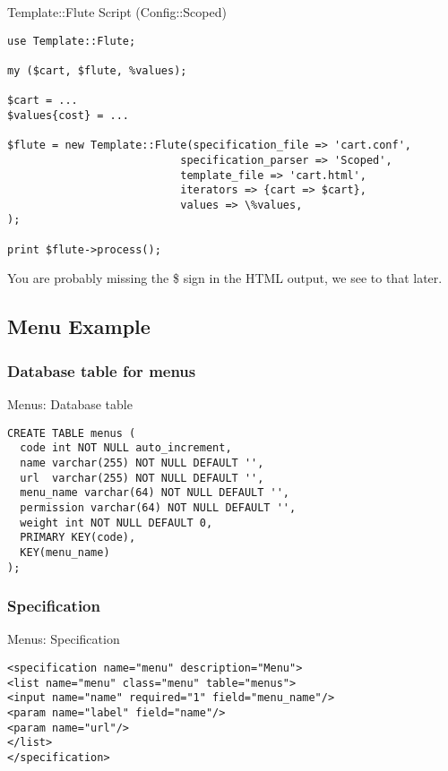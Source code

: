 \begin{frame}[fragile]{Template::Flute Script (Config::Scoped)}
\begin{lstlisting}
use Template::Flute;

my ($cart, $flute, %values);

$cart = ...
$values{cost} = ...

$flute = new Template::Flute(specification_file => 'cart.conf',
                           specification_parser => 'Scoped',
                           template_file => 'cart.html',
                           iterators => {cart => $cart},
                           values => \%values,
);

print $flute->process();
\end{lstlisting}
\end{frame}

You are probably missing the \$ sign in the HTML output, we see
to that later.

\subsection{Menu Example}
\subsubsection{Database table for menus}
\begin{frame}[fragile]{Menus: Database table}
\begin{lstlisting}
CREATE TABLE menus (
  code int NOT NULL auto_increment,
  name varchar(255) NOT NULL DEFAULT '',
  url  varchar(255) NOT NULL DEFAULT '',
  menu_name varchar(64) NOT NULL DEFAULT '',
  permission varchar(64) NOT NULL DEFAULT '',
  weight int NOT NULL DEFAULT 0,
  PRIMARY KEY(code),
  KEY(menu_name)
);
\end{lstlisting}
\end{frame}

\subsubsection{Specification}
\begin{frame}[fragile]{Menus: Specification}
\begin{lstlisting}
<specification name="menu" description="Menu">
<list name="menu" class="menu" table="menus">
<input name="name" required="1" field="menu_name"/>
<param name="label" field="name"/>
<param name="url"/>
</list>
</specification>
\end{lstlisting}
\end{frame}


